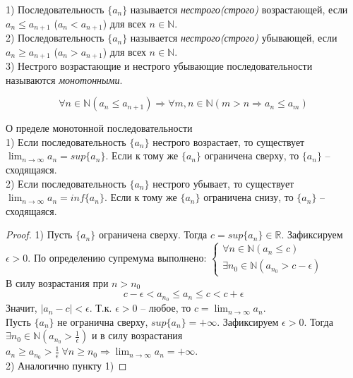     \begin{definition}
        1) Последовательность $\{a_{n}\}$ называется \textit{нестрого(строго)} возрастающей, если $a_{n} \leq a_{n+1}$ ($a_{n} < a_{n+1}$) для всех $n \in \mathds{N}$.
        \\
        2) Последовательность $\{a_{n}\}$ называется \textit{нестрого(строго)} убывающей, если $a_{n} \geq a_{n+1}$ ($a_{n} > a_{n+1}$) для всех $n \in \mathds{N}$.
        \\
        3) Нестрого возрастающие и нестрого убывающие последовательности называются \textit{монотонными}.
    \end{definition}
    
    \begin{note}
        \[\forall n \in \mathds{N} (a_{n} \leq a_{n+1}) \Rightarrow \forall m,n \in \mathds{N} (m > n \Rightarrow a_{n} \leq a_{m})\]
    \end{note}
    
    \begin{theorem}{О пределе монотонной последовательности}
        \\
        1) Если последовательность $\{a_{n}\}$ нестрого возрастает, то существует $\lim_{n \to \infty} a_{n} = sup\{a_{n}\}$. Если к тому же $\{a_{n}\}$ ограничена сверху, то $\{a_{n}\}$ -- сходящаяся.
        \\
        2) Если последовательность $\{a_{n}\}$ нестрого убывает, то существует $\lim_{n \to \infty} a_{n} = inf\{a_{n}\}$. Если к тому же $\{a_{n}\}$ ограничена снизу, то $\{a_{n}\}$ -- сходящаяся.
    \end{theorem}
    
    \begin{proof}
        1) Пусть $\{a_{n}\}$ ограничена сверху. Тогда $c = sup\{a_{n}\} \in \mathds{R}$. Зафиксируем $\epsilon > 0$. По определению супремума выполнено:
        $\begin{cases}
            \forall n \in \mathds{N} (a_{n} \leq c)
            \\
            \exists n_{0} \in \mathds{N} (a_{n_{0}} > c - \epsilon)
        \end{cases}$
        \\
        В силу возрастания при $n > n_{0}$
        \[c - \epsilon < a_{n_{0}} \leq a_{n} \leq c < c + \epsilon\]
        Значит, $|a_{n} - c| < \epsilon$. Т.к. $\epsilon > 0$ -- любое, то $c = \lim_{n \to \infty} a_{n}$.
        \\
        Пусть $\{a_{n}\}$ не огранична сверху, $sup\{a_{n}\} = + \infty$. Зафиксируем $\epsilon > 0$. Тогда $\exists n_{0} \in \mathds{N} (a_{n_{0}} > \frac{1}{\epsilon})$ и в силу возрастания $a_{n} \geq a_{n_{0}} > \frac{1}{\epsilon} \ \forall n \geq n_{0} \Rightarrow \lim_{n \to \infty} a_{n} = + \infty$.
        \\
        2) Аналогично пункту 1)
    \end{proof}
    
